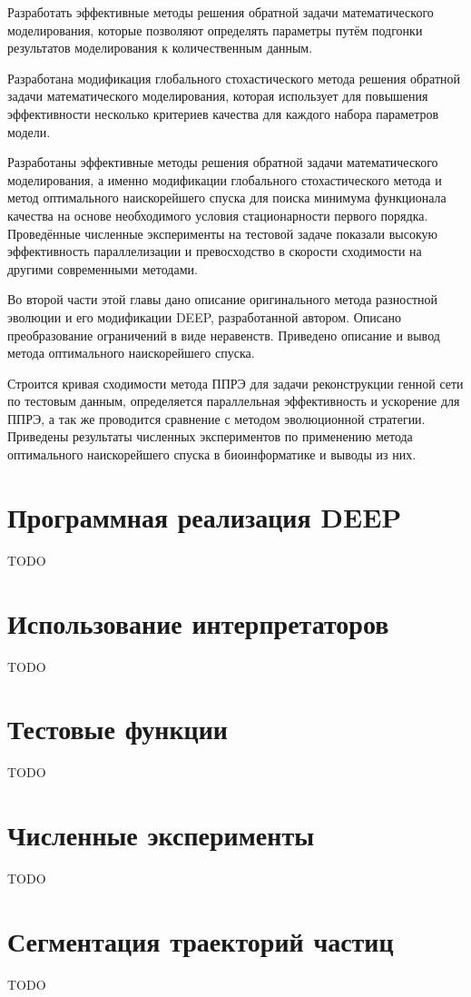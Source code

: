 Разработать эффективные методы решения обратной задачи математического моделирования, которые позволяют определять параметры путём подгонки результатов моделирования к количественным данным.

Разработана модификация глобального стохастического метода решения обратной задачи математического моделирования, которая использует для повышения эффективности несколько критериев качества для каждого набора параметров модели.

Разработаны эффективные методы решения обратной задачи математического моделирования, а именно модификации глобального стохастического метода и метод оптимального наискорейшего спуска для поиска минимума функционала качества на основе необходимого условия стационарности первого порядка.
Проведённые численные эксперименты на тестовой задаче показали высокую эффективность параллелизации и превосходство в скорости сходимости на другими современными методами.

Во второй части этой главы дано описание оригинального метода разностной эволюции и его модификации DEEP, разработанной автором.
Описано преобразование ограничений в виде неравенств.
Приведено описание и вывод метода оптимального наискорейшего спуска.

Строится кривая сходимости метода ППРЭ для задачи реконструкции генной сети по тестовым данным, определяется параллельная эффективность и ускорение для ППРЭ, а так же проводится сравнение с методом эволюционной стратегии.
Приведены результаты численных экспериментов по применению метода оптимального наискорейшего спуска в биоинформатике и выводы из них.


\section*{Программная реализация DEEP}
TODO

\section*{Использование интерпретаторов}
TODO

\section*{Тестовые функции}
TODO

\section*{Численные эксперименты}
TODO

\section*{Сегментация траекторий частиц}
TODO

